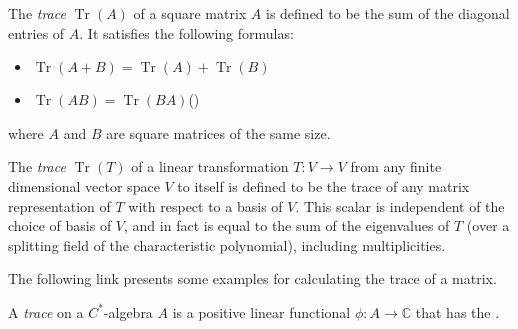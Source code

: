 \documentclass[12pt]{article}
\begin{document}
The {\em trace} $\operatorname{Tr}(A)$ of a square matrix $A$ is defined to be the sum of the diagonal entries of $A$. It satisfies the following formulas:
\begin{itemize}
\item $\operatorname{Tr}(A+B) = \operatorname{Tr}(A) + \operatorname{Tr}(B)$
\item $\operatorname{Tr}(AB) = \operatorname{Tr}(BA)$\quad\quad ()
\end{itemize}
where $A$ and $B$ are square matrices of the same size.

The {\em trace} $\operatorname{Tr}(T)$ of a linear transformation $T\colon V \longrightarrow V$ from any finite dimensional vector space $V$ to itself is defined to be the trace of any matrix representation of $T$ with respect to a basis of $V$. This scalar is independent of the choice of basis of $V$, and in fact is equal to the sum of the eigenvalues of $T$ (over a splitting field of the characteristic polynomial), including multiplicities.

The following link presents some examples for calculating the trace of a matrix.

A {\em trace} on a $C^*$-algebra $A$ is a positive linear functional $\phi\colon A\to\mathbb{C}$ that has the .
\end{document}
